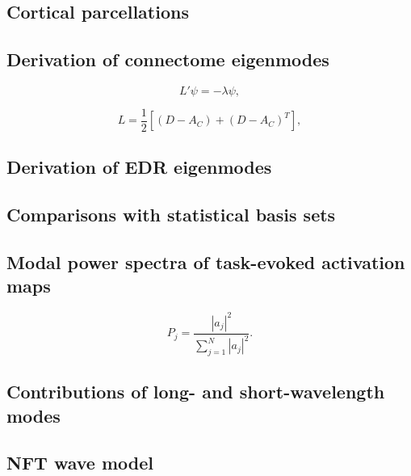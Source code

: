 \documentclass[sn-mathphys-num]{sn-jnl}%
\theoremstyle{thmstyleone}%
\theoremstyle{thmstyletwo}%
\theoremstyle{thmstylethree}%
\begin{document}
\subsection{Cortical parcellations} \label{sec:cortical_parcellations}


\subsection{Derivation of connectome eigenmodes} \label{sec:connectome_derivation}

\begin{equation}\label{eq:connectome_eigenmodes}
	L' \psi = - \lambda \psi,
\end{equation}


\begin{equation}\label{eq:unnormalized_Laplacian}
	L = \frac{1}{2} [ (D-A_C) + (D-A_C)^T ],
\end{equation}


\subsection{Derivation of EDR eigenmodes} \label{sec:EDR_derivation}


\subsection{Comparisons with statistical basis sets} \label{sec:sets_comparisons}


\subsection{Modal power spectra of task-evoked activation maps} \label{sec:modal_power}


\begin{equation}\label{eq:normalized_power}
	P_j = \frac{|a_j|^2}{\sum_{j=1}^{N} |a_j|^2 }.
\end{equation}


\subsection{Contributions of long- and short-wavelength modes} \label{sec:wavelength_contributions}


\subsection{NFT wave model} \label{sec:NFT_model}
\end{document}
